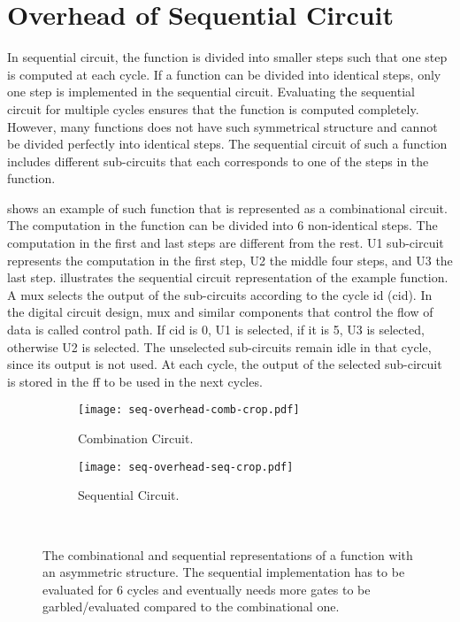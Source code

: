 \section{Overhead of Sequential Circuit}\label{sec:seq-overhead}
In sequential circuit, the function is divided into smaller steps such that one step is computed at each cycle.
If a function can be divided into identical steps, only one step is implemented in the sequential circuit.
Evaluating the sequential circuit for multiple cycles ensures that the function is computed completely.
However, many functions does not have such symmetrical structure and cannot be divided perfectly into identical steps.
The sequential circuit of such a function includes different sub-circuits that each corresponds to one of the steps in the function.

 shows an example of such function that is represented as a combinational circuit.
The computation in the function can be divided into 6 non-identical steps.
The computation in the first and last steps are different from the rest.
U1 sub-circuit represents the computation in the first step, U2 the middle four steps, and U3 the last step.
 illustrates the sequential circuit representation of the example function.
A \acrshort{mux} selects the output of the sub-circuits according to the cycle id (cid).
In the digital circuit design, \acrshort{mux} and similar components that control the flow of data is called control path.
If cid is 0, U1 is selected, if it is 5, U3 is selected, otherwise U2 is selected.
The unselected sub-circuits remain idle in that cycle, since its output is not used.
At each cycle, the output of the selected sub-circuit is stored in the \acrshort{ff} to be used in the next cycles.

\begin{figure}[ht]
    \centering
    \begin{subfigure}[t]{0.8\textwidth}
        \texttt{[image: seq-overhead-comb-crop.pdf]}
        \caption{Combination Circuit.}\label{fig:seq-overhead-comb}
    \end{subfigure}
    \begin{subfigure}[t]{0.7\textwidth}
        \texttt{[image: seq-overhead-seq-crop.pdf]}
        \caption{Sequential Circuit.}\label{fig:seq-overhead-seq}
    \end{subfigure}\\
    \caption{The combinational and sequential representations of a function with an asymmetric structure.
    The sequential implementation has to be evaluated for 6 cycles and eventually needs more gates to be garbled/evaluated compared to the combinational one.}\label{fig:fig:seq-overhead-comb}
\end{figure}

